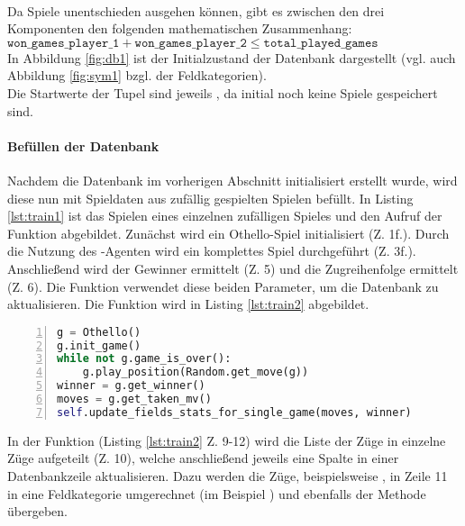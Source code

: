 \\Da Spiele unentschieden ausgehen können, gibt es zwischen den drei Komponenten den folgenden mathematischen Zusammenhang: 
\\$\mathtt{won\_games\_player\_1} + \mathtt{won\_games\_player\_2} \le \mathtt{total\_played\_games}$
\\In Abbildung \ref{fig:db1} ist der Initialzustand der Datenbank dargestellt (vgl. auch Abbildung \ref{fig:sym1} bzgl. der Feldkategorien). 
\\
Die Startwerte der Tupel sind jeweils , da initial noch keine Spiele gespeichert sind.
\paragraph{Befüllen der Datenbank}
\label{para:train1}
Nachdem die Datenbank im vorherigen Abschnitt initialisiert erstellt wurde, wird diese nun mit Spieldaten aus zufällig gespielten Spielen befüllt. In Listing \ref{lst:train1} ist das Spielen eines einzelnen zufälligen Spieles und den Aufruf der Funktion  abgebildet. Zunächst wird ein Othello-Spiel initialisiert (Z. 1f.). Durch die Nutzung des -Agenten wird ein komplettes Spiel durchgeführt (Z. 3f.). Anschließend wird der Gewinner ermittelt (Z. 5) und die Zugreihenfolge ermittelt (Z. 6). Die Funktion  verwendet diese beiden Parameter, um die Datenbank zu aktualisieren. Die Funktion wird in Listing \ref{lst:train2} abgebildet.
\newpage
\begin{lstlisting}[basicstyle=\footnotesize, caption = {Befüllen der Datenbank 1}, language = python, captionpos = t , numbers=left, label={lst:train1}]
g = Othello()
g.init_game()
while not g.game_is_over():
	g.play_position(Random.get_move(g))
winner = g.get_winner()
moves = g.get_taken_mv()
self.update_fields_stats_for_single_game(moves, winner)
\end{lstlisting}
In der Funktion  (Listing \ref{lst:train2} Z. 9-12) wird die Liste der Züge in einzelne Züge aufgeteilt (Z. 10), welche anschließend jeweils eine Spalte in einer Datenbankzeile aktualisieren. Dazu werden die Züge, beispielsweise , in Zeile 11 in eine Feldkategorie umgerechnet (im Beispiel ) und ebenfalls der Methode  übergeben.
